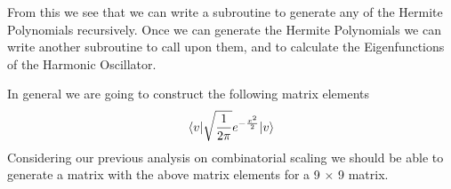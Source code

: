 \documentclass{article}
\begin{document}
From this we see that we can write a subroutine to generate any of the Hermite Polynomials recursively. 
Once we can generate the Hermite Polynomials we can write another subroutine to call upon them, and to calculate the Eigenfunctions of the Harmonic Oscillator. 

In general we are going to construct the following matrix elements
\begin{equation}
    \braket{v|\sqrt{\frac{1}{2\pi}}e^{-\frac{x^2}{2}}|v}
\end{equation}
Considering our previous analysis on combinatorial scaling we should be able to generate a matrix with the above matrix elements for a 9 $\times$ 9 matrix.
\end{document}
